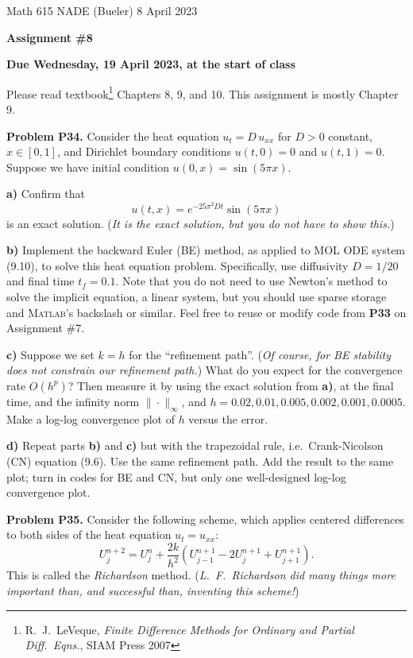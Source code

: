 \documentclass[12pt]{amsart}
\newcommand{\Matlab}{\textsc{Matlab}\xspace}
\newcommand{\prob}[1]{\bigskip\noindent\textbf{#1}\quad }
\newcommand{\epart}[1]{\medskip\noindent\textbf{#1)}\quad }
\begin{document}
\scriptsize \noindent Math 615 NADE (Bueler) \hfill 8 April 2023
\normalsize

\medskip\bigskip

\Large\centerline{\textbf{Assignment \#8}}
\large
\bigskip

\centerline{\textbf{Due Wednesday, 19 April 2023, at the start of class}}
\bigskip
\normalsize

\thispagestyle{empty}

\bigskip
Please read textbook\footnote{R.~J.~LeVeque, \emph{Finite Difference Methods for Ordinary and Partial Diff.~Eqns.}, SIAM Press 2007} Chapters 8, 9, and 10.  This assignment is mostly Chapter 9.


\medskip
\prob{Problem P34.}  Consider the heat equation $u_t = D\, u_{xx}$ for $D>0$ constant, $x\in [0,1]$, and Dirichlet boundary conditions $u(t,0)=0$ and $u(t,1)=0$.  Suppose we have initial condition $u(0,x) = \sin(5\pi x)$.

\epart{a}  Confirm that
    $$u(t,x) = e^{-25 \pi^2 D t} \sin(5 \pi x)$$
is an exact solution.  (\emph{It is \emph{the} exact solution, but you do not have to show this.})

\epart{b}  Implement the backward Euler (BE) method, as applied to MOL ODE system (9.10), to solve this heat equation problem.  Specifically, use diffusivity $D = 1/20$ and final time $t_f=0.1$.  Note that you do not need to use Newton's method to solve the implicit equation, a linear system, but you should use sparse storage and \Matlab's backslash or similar.  Feel free to reuse or modify code from \textbf{P33} on Assignment \#7.

\epart{c}  Suppose we set $k=h$ for the ``refinement path''.  (\emph{Of course, for BE stability \emph{does not} constrain our refinement path.})  What do you expect for the convergence rate $O(h^p)$?  Then measure it by using the exact solution from \textbf{a)}, at the final time, and the infinity norm $\|\cdot\|_\infty$, and $h=0.02, 0.01,0.005,0.002,0.001,0.0005$.  Make a log-log convergence plot of $h$ versus the error.

\epart{d}  Repeat parts \textbf{b)} and \textbf{c)} but with the trapezoidal rule, i.e.~Crank-Nicolson (CN) equation (9.6).  Use the same refinement path.  Add the result to the same plot; turn in codes for BE and CN, but only one well-designed log-log convergence plot.


\prob{Problem P35.}   Consider the following scheme, which applies centered differences to both sides of the heat equation $u_t=u_{xx}$:
    $$U_j^{n+2} = U_j^n + \frac{2k}{h^2}(U_{j-1}^{n+1} - 2U_j^{n+1} +
U_{j+1}^{n+1}).$$
This is called the \emph{Richardson} method.  (\emph{L.~F.~Richardson did many things more important than, and successful than, inventing this scheme!})
\end{document}
